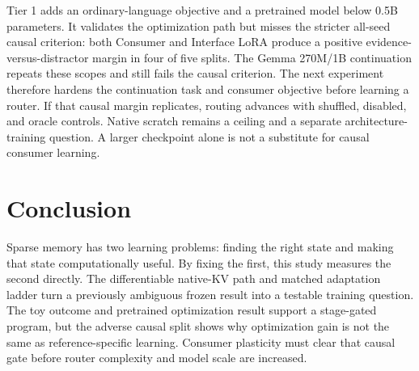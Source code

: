 \documentclass[11pt]{article}
\begin{document}
Tier 1 adds an ordinary-language objective and a pretrained model below 0.5B
parameters. It validates the optimization path but misses the stricter
all-seed causal criterion: both Consumer and Interface LoRA produce a positive
evidence-versus-distractor margin in four of five splits. The Gemma 270M/1B
continuation repeats these scopes and still fails the causal criterion. The
next experiment therefore hardens the continuation task and consumer objective
before learning a router. If that causal margin replicates, routing advances with
shuffled, disabled, and oracle controls. Native scratch remains a ceiling and
a separate architecture-training question. A larger checkpoint alone is not a
substitute for causal consumer learning.

\section{Conclusion}

Sparse memory has two learning problems: finding the right state and making that
state computationally useful. By fixing the first, this study measures the second
directly. The differentiable native-KV path and matched adaptation ladder turn a
previously ambiguous frozen result into a testable training question. The toy
outcome and pretrained optimization result support a stage-gated program, but
the adverse causal split shows why optimization gain is not the same as
reference-specific learning. Consumer plasticity must clear that causal gate
before router complexity and model scale are increased.

\small


\end{document}
